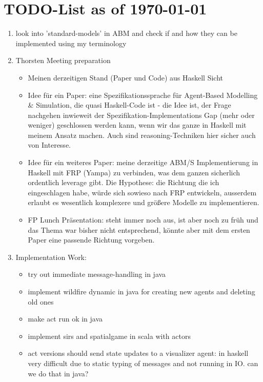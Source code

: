 \section{TODO-List as of \today}

\begin{enumerate}

\item look into 'standard-models' in ABM and check if and how they can be implemented using my terminology

\item Thorsten Meeting preparation
\begin{itemize}
	\item Meinen derzeitigen Stand (Paper und Code) aus Haskell Sicht
	\item Idee für ein Paper: eine Spezifikationssprache für Agent-Based Modelling & Simulation, die quasi Haskell-Code ist - die Idee ist, der Frage nachgehen inwieweit der Spezifikation-Implementations Gap (mehr oder weniger) geschlossen werden kann, wenn wir das ganze in Haskell mit meinem Ansatz machen. Auch sind reasoning-Techniken hier sicher auch von Interesse.
	\item Idee für ein weiteres Paper: meine derzeitige ABM/S Implementierung in Haskell mit FRP (Yampa) zu verbinden, was dem ganzen sicherlich ordentlich leverage gibt. Die Hypothese: die Richtung die ich eingeschlagen habe, würde sich sowieso nach FRP entwickeln, ausserdem erlaubt es wesentlich komplexere und größere Modelle zu implementieren.
	\item FP Lunch Präsentation: steht immer noch aus, ist aber noch zu früh und das Thema war bisher nicht entsprechend, könnte aber mit dem ersten Paper eine passende Richtung vorgeben.
\end{itemize}

\item Implementation Work:
	\begin{itemize}
		\item try out immediate message-handling in java
		\item implement wildfire dynamic in java for creating new agents and deleting old ones
		\item make act run ok in java
		\item implement sirs and spatialgame in scala with actors
		\item act versions should send state updates to a visualizer agent: in haskell very difficult due to static typing of messages and not running in IO. can we do that in java?
		

\end{itemize}
\end{enumerate}
